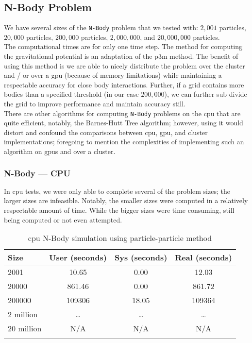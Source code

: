 \subsection{N-Body Problem}

We have several sizes of the \texttt{N-Body} problem that we tested with:
$2,001$ particles, $20,000$ particles, $200,000$ particles, $2,000,000$, and
$20,000,000$ particles.\\

The computational times are for only one time step. The method for computing
the gravitational potential is an adaptation of the \gls{p3m} method. The
benefit of using this method is we are able to nicely distribute the problem
over the \gls{cluster} and / or over a \gls{gpu} (because of memory
limitations) while maintaining a respectable accuracy for close body
interactions. Further, if a grid contains more bodies than a specified
threshold (in our case $200,000$), we can further sub-divide the grid to
improve performance and maintain accuracy still.\\

There are other algorithms for computing \texttt{N-Body} problems on the
\gls{cpu} that are quite efficient, notably, the Barnes-Hutt Tree algorithm;
however, using it would distort and confound the comparisons between \gls{cpu},
\gls{gpu}, and \gls{cluster} implementations; foregoing to mention the
complexities of implementing such an algorithm on \glspl{gpu} and over a
\gls{cluster}.

\subsubsection{N-Body --- CPU}

In \gls{cpu} tests, we were only able to complete several of the problem sizes;
the larger sizes are infeasible. Notably, the smaller sizes were computed in a
relatively respectable amount of time. While the bigger sizes were time
consuming, still being computed or not even attempted.

\begin{table}[htb]
\centering{}
\begin{tabular}{lccc}
\toprule{}
\textbf{Size} & \textbf{User (seconds)} &
\textbf{Sys (seconds)} & \textbf{Real (seconds)} \\
\midrule{}
2001          & 10.65   & 0.00    & 12.03 \\
\midrule{}
20000         & 861.46  & 0.00    & 861.72 \\
\midrule{}
200000        & 109306  & 18.05   & 109364 \\
\midrule{}
2 million     & \dots{} & \dots{} & \dots{} \\
\midrule{}
20 million    & N/A     & N/A     & N/A \\
\bottomrule{}
\end{tabular}
\caption{\gls{cpu} N-Body simulation using particle-particle method}
\label{tab:cpu_nbody}
\end{table}

